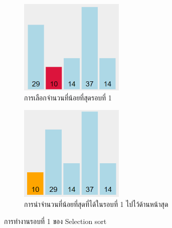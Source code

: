 \begin{figure}[h!]
	\centering
    \begin{subfigure}{.5\textwidth}
    	\centering
        \includegraphics[width=5cm]{images/selection-sort-round-1-1}
        \caption{การเลือกจำนวนที่น้อยที่สุดรอบที่ 1}
        \label{fig:selection_sort_round-1-1}
    \end{subfigure}%
    \begin{subfigure}{.5\textwidth}
    	\centering
        \includegraphics[width=5cm]{images/selection-sort-round-1-2}
        \caption{การนำจำนวนที่น้อยที่สุดที่ได้ในรอบที่ 1 ไปไว้ด้านหน้าสุด}
        \label{fig:selection_sort_round-1-2}
    \end{subfigure}
    \caption{การทำงานรอบที่ 1 ของ Selection sort}
    \label{fig:selection_sort_round-1}
\end{figure}

